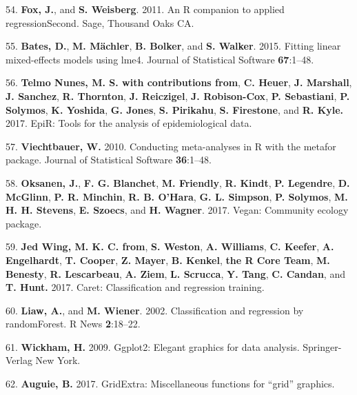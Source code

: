 \documentclass[12pt,]{article}
\begin{document}
\hypertarget{ref-car_citation_2011}{}
54. \textbf{Fox, J.}, and \textbf{S. Weisberg}. 2011. An R companion to
applied regressionSecond. Sage, Thousand Oaks CA.

\hypertarget{ref-lme4_citation_2015}{}
55. \textbf{Bates, D.}, \textbf{M. Mächler}, \textbf{B. Bolker}, and
\textbf{S. Walker}. 2015. Fitting linear mixed-effects models using
lme4. Journal of Statistical Software \textbf{67}:1--48.

\hypertarget{ref-epir_citation_2017}{}
56. \textbf{Telmo Nunes, M. S. with contributions from}, \textbf{C.
Heuer}, \textbf{J. Marshall}, \textbf{J. Sanchez}, \textbf{R. Thornton},
\textbf{J. Reiczigel}, \textbf{J. Robison-Cox}, \textbf{P. Sebastiani},
\textbf{P. Solymos}, \textbf{K. Yoshida}, \textbf{G. Jones}, \textbf{S.
Pirikahu}, \textbf{S. Firestone}, and \textbf{R. Kyle.} 2017. EpiR:
Tools for the analysis of epidemiological data.

\hypertarget{ref-metafor_citation_2010}{}
57. \textbf{Viechtbauer, W.} 2010. Conducting meta-analyses in R with
the metafor package. Journal of Statistical Software \textbf{36}:1--48.

\hypertarget{ref-vegan_citation_2017}{}
58. \textbf{Oksanen, J.}, \textbf{F. G. Blanchet}, \textbf{M. Friendly},
\textbf{R. Kindt}, \textbf{P. Legendre}, \textbf{D. McGlinn}, \textbf{P.
R. Minchin}, \textbf{R. B. O'Hara}, \textbf{G. L. Simpson}, \textbf{P.
Solymos}, \textbf{M. H. H. Stevens}, \textbf{E. Szoecs}, and \textbf{H.
Wagner}. 2017. Vegan: Community ecology package.

\hypertarget{ref-caret_citation_2017}{}
59. \textbf{Jed Wing, M. K. C. from}, \textbf{S. Weston}, \textbf{A.
Williams}, \textbf{C. Keefer}, \textbf{A. Engelhardt}, \textbf{T.
Cooper}, \textbf{Z. Mayer}, \textbf{B. Kenkel}, \textbf{the R Core
Team}, \textbf{M. Benesty}, \textbf{R. Lescarbeau}, \textbf{A. Ziem},
\textbf{L. Scrucca}, \textbf{Y. Tang}, \textbf{C. Candan}, and
\textbf{T. Hunt.} 2017. Caret: Classification and regression training.

\hypertarget{ref-randomforest_citation_2002}{}
60. \textbf{Liaw, A.}, and \textbf{M. Wiener}. 2002. Classification and
regression by randomForest. R News \textbf{2}:18--22.

\hypertarget{ref-ggplot2_citation_2009}{}
61. \textbf{Wickham, H.} 2009. Ggplot2: Elegant graphics for data
analysis. Springer-Verlag New York.

\hypertarget{ref-gridextra_citation_2017}{}
62. \textbf{Auguie, B.} 2017. GridExtra: Miscellaneous functions for
``grid'' graphics.
\end{document}
